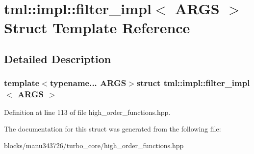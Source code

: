 \hypertarget{structtml_1_1impl_1_1filter__impl}{\section{tml\+:\+:impl\+:\+:filter\+\_\+impl$<$ A\+R\+G\+S $>$ Struct Template Reference}
\label{structtml_1_1impl_1_1filter__impl}
}


\subsection{Detailed Description}
\subsubsection*{template$<$typename... A\+R\+G\+S$>$struct tml\+::impl\+::filter\+\_\+impl$<$ A\+R\+G\+S $>$}



Definition at line 113 of file high\+\_\+order\+\_\+functions.\+hpp.



The documentation for this struct was generated from the following file\+:\begin{DoxyCompactItemize}
\item 
blocks/manu343726/turbo\+\_\+core/high\+\_\+order\+\_\+functions.\+hpp\end{DoxyCompactItemize}
